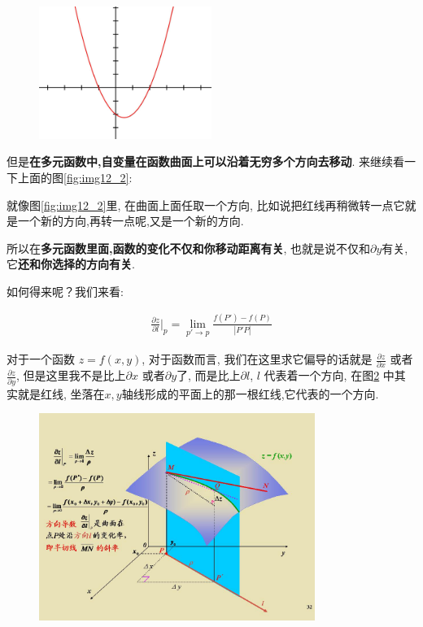 \begin{figure}[ht]
  \centering
  \includegraphics[width=0.5\textwidth]{asset/20230901095921.png}
  \caption{}
  \label{fig:img12_3}
\end{figure}

但是\textbf{在多元函数中,自变量在函数曲面上可以沿着无穷多个方向去移动}. 来继续看一下上面的图\ref{fig:img12_2}: 

就像图\ref{fig:img12_2}里, 在曲面上面任取一个方向, 比如说把红线再稍微转一点它就是一个新的方向,再转一点呢,又是一个新的方向. 

所以在\textbf{多元函数里面,函数的变化不仅和你移动距离有关}, 也就是说不仅和$\partial y$有关, 它\textbf{还和你选择的方向有关}. 

如何得来呢？我们来看: 

\begin{align*}
  \frac{\partial z}{\partial l} \Bigg \vert _p = \lim_{p' \to p} \frac{f(P') - f(P)}{|P'P|}
\end{align*}

对于一个函数 $z=f(x,y)$, 对于函数而言, 我们在这里求它偏导的话就是 $\frac{\partial z}{\partial x}$ 或者 $\frac{\partial z}{\partial y}$, 但是这里我不是比上$\partial x$ 或者$\partial y$了, 而是比上$\partial l$, $l$ 代表着一个方向, 在图\ref{fig:img12_4} 中其实就是红线, 坐落在$x, y$轴线形成的平面上的那一根红线,它代表的一个方向. 

\begin{figure}[ht]
  \centering
  \includegraphics[width=0.8\textwidth]{asset/20230901103919.png}
  \caption{}
  \label{fig:img12_4}
\end{figure}

